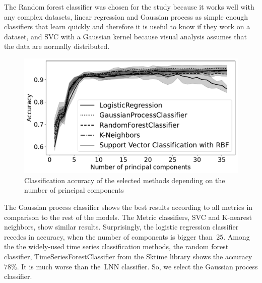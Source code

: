 \documentclass[12pt]{paper}
\begin{document}
The Random forest classifier was chosen for the study because it works well with any complex
datasets, linear regression and Gaussian process as simple enough classifiers that learn quickly
and therefore it is useful to know if they work on a dataset, and SVC with a Gaussian kernel
because visual analysis assumes that the data are normally distributed.

\begin{figure}[!htbp]
 \centering
 \includegraphics[scale = 0.5]{Accuracy.pdf}
 \caption{Classification accuracy of the selected methods depending on the number of principal
components}
 \label{fig: Accuracy}
\end{figure}

The Gaussian process classifier shows the best results according to all metrics in comparison to the rest of the models. The Metric classifiers, SVC and K-nearest neighbors, show similar results. Surprisingly, the logistic regression classifier recedes in accuracy, when the number of components is bigger than~$25$.  Among the the widely-used time series classification methods, the random forest classifier,  TimeSeriesForestClassifier from the Sktime library shows the accuracy $78\%$. It is much worse than the~LNN classifier. So, we select the Gaussian process classifier. 
\end{document}
